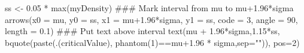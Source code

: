 \begin{Schunk}
\begin{Sinput}
 ss <- 0.05 * max(myDensity)
 ### Mark interval from mu to mu+1.96*sigma
 arrows(x0 = mu, y0 = ss, x1 = mu+1.96*sigma, y1 = ss, code = 3, angle = 90, length = 0.1)
 ### Put text above interval
 text(mu + 1.96*sigma,1.15*ss, bquote(paste(.(criticalValue), phantom(1)==mu+1.96 * sigma,sep="")), pos=2)
\end{Sinput}
\end{Schunk}
